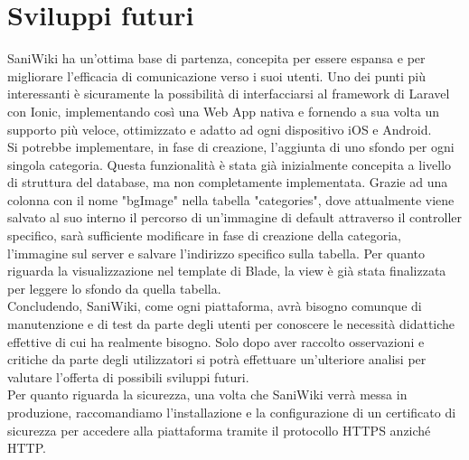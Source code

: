 \documentclass[twoside]{supsistudent}
\begin{document}
\section{Sviluppi futuri}
SaniWiki ha un'ottima base di partenza, concepita per essere espansa e per migliorare l'efficacia di comunicazione verso i suoi utenti. Uno dei punti più interessanti è sicuramente la possibilità di interfacciarsi al framework di Laravel con Ionic, implementando così una Web App nativa e fornendo a sua volta un supporto più veloce, ottimizzato e adatto ad ogni dispositivo iOS e Android.\\
Si potrebbe implementare, in fase di creazione, l'aggiunta di uno sfondo per ogni singola categoria. Questa funzionalità è stata già inizialmente concepita a livello di struttura del database, ma non completamente implementata. Grazie ad una colonna con il nome "bgImage" nella tabella "categories", dove attualmente viene salvato al suo interno il percorso di un'immagine di default attraverso il controller specifico, sarà sufficiente modificare in fase di creazione della categoria, l'immagine sul server e salvare l'indirizzo specifico sulla tabella.  Per quanto riguarda la visualizzazione nel template di Blade, la view è già stata finalizzata per leggere lo sfondo da quella tabella.\\
Concludendo, SaniWiki, come ogni piattaforma, avrà bisogno comunque di manutenzione e di test da parte degli utenti per conoscere le necessità didattiche effettive di cui ha realmente bisogno. Solo dopo aver raccolto osservazioni e critiche da parte degli utilizzatori si potrà effettuare un'ulteriore analisi per valutare l'offerta di possibili sviluppi futuri.\\
Per quanto riguarda la sicurezza, una volta che SaniWiki verrà messa in produzione, raccomandiamo l'installazione e la configurazione di un certificato di sicurezza per accedere alla piattaforma tramite il protocollo HTTPS anziché HTTP.
\end{document}
